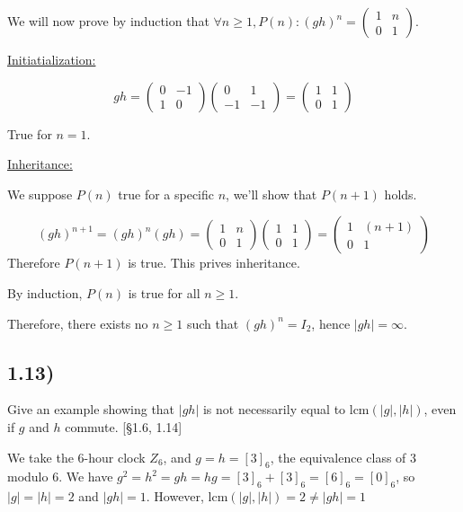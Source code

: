We will now prove by induction that $\forall n \geq 1, P(n): (gh)^n = \begin{pmatrix} 1 & n \\ 0 & 1 \end{pmatrix}$.

\underline{Initiatialization:}

$$
gh = \begin{pmatrix} 0 & -1 \\ 1 & 0 \end{pmatrix} \begin{pmatrix} 0 & 1 \\ -1 & -1 \end{pmatrix}
   = \begin{pmatrix} 1 & 1 \\ 0 & 1 \end{pmatrix}
$$

True for $n = 1$.

\underline{Inheritance:}

We suppose $P(n)$ true for a specific $n$, we'll show that $P(n+1)$ holds.

$$
(gh)^{n+1} = (gh)^n(gh)
       = \begin{pmatrix} 1 & n \\ 0 & 1 \end{pmatrix} \begin{pmatrix} 1 & 1 \\ 0 & 1 \end{pmatrix}
	   = \begin{pmatrix} 1 & (n+1) \\ 0 & 1 \end{pmatrix}
$$
Therefore $P(n+1)$ is true. This prives inheritance.

By induction, $P(n)$ is true for all $n \geq 1$.

Therefore, there exists no $n \geq 1$ such that $(gh)^n = I_2$, hence $|gh| = \infty$.



\subsection*{1.13)}

Give an example showing that $|gh|$ is not necessarily equal to $\text{lcm}(|g|, |h|)$, even if $g$ and $h$ commute. [§1.6, 1.14]

We take the 6-hour clock $Z_6$, and $g = h = [3]_6$, the equivalence class of 3 modulo 6.  We have $g^2 = h^2 = gh = hg = [3]_6 + [3]_6 = [6]_6 = [0]_6$, so $|g| = |h| = 2$ and $|gh| = 1$. However, $\text{lcm}(|g|, |h|) = 2 \ne |gh| = 1$



